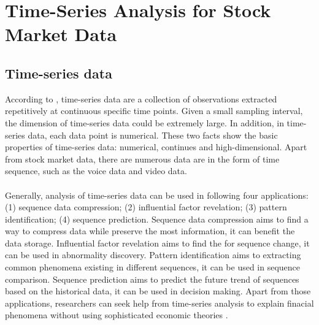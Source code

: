 \section{Time-Series Analysis for Stock Market Data}
\subsection{Time-series data}
According to \cite{davis2014introduction}, time-series data are a collection of observations extracted repetitively at continuous specific time points. Given a small sampling interval, the dimension of time-series data could be extremely large. In addition, in time-series data, each data point is numerical. These two facts show the basic properties of time-series data: numerical, continues and high-dimensional. Apart from stock market data, there are numerous data are in the form of time sequence, such as the voice data and video data.\\
\\Generally, analysis of time-series data can be used in following four applications: (1) sequence data compression; (2) influential factor revelation; (3) pattern identification; (4) sequence prediction. Sequence data compression aims to find a way to compress data while preserve the most information, it can benefit the data storage. Influential factor revelation aims to find the for sequence change, it can be used in abnormality discovery. Pattern identification aims to extracting common phenomena existing in different sequences, it can be used in sequence comparison. Sequence prediction aims to predict the future trend of sequences based on the historical data, it can be used in decision making. Apart from those applications, researchers can seek help from time-series analysis to explain finacial phenomena without using sophisticated economic theories \cite{han1999efficient}.

